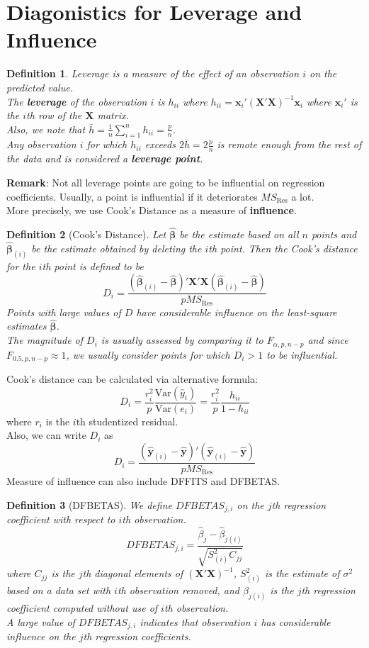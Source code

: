 \documentclass[11pt]{article}
\newcommand{\var}{\mathrm{Var}}
\newtheorem{definition}{Definition}[section]
\theoremstyle{definition}
\begin{document}
\section{Diagonistics for Leverage and Influence}
\begin{definition}
\normalfont Leverage is a measure of the effect of an observation $i$ on the predicted value.\\
The \textbf{leverage} of the observation $i$ is $h_{ii}$ where $h_{ii}=\bm{x}_i'(\bm{X}'\bm{X})^{-1}\bm{x}_i$ where $\bm{x}_i'$ is the $i$th row of the $\bm{X}$ matrix.\\
Also, we note that $\bar{h}=\frac{1}{n}\sum_{i=1}^n h_{ii}=\frac{p}{n}$.\\
Any observation $i$ for which $h_{ii}$ exceeds $2\bar{h}=2\frac{p}{n}$ is remote enough from the rest of the data and is considered a \textbf{leverage point}.
\end{definition}
\textbf{Remark}: Not all leverage points are going to be influential on regression coefficients. Usually, a point is influential if it deteriorates $MS_\text{Res}$ a lot.\\
More precisely, we use Cook's Distance as a measure of \textbf{influence}.
\begin{definition}[Cook's Distance]
\normalfont Let $\hat{\bm{\beta}}$ be the estimate based on all $n$ points and $\hat{\bm{\beta}}_{(i)}$ be the estimate obtained by deleting the $i$th point. Then the Cook's distance for the $i$th point is defined to be
\[
D_i=\frac{(\hat{\bm{\beta}}_{(i)}-\hat{\bm{\beta}})'\bm{X}'\bm{X}(\hat{\bm{\beta}}_{(i)}-\hat{\bm{\beta}})}{pMS_\text{Res}}
\]
Points with large values of $D$ have considerable influence on the least-square estimates $\hat{\bm{\beta}}$.\\
The magnitude of $D_i$ is usually assessed by comparing it to $F_{\alpha, p, n-p}$ and since $F_{0.5, p, n-p}\approx 1$, we usually consider points for which $D_i>1$ to be influential.
\end{definition}
Cook's distance can be calculated via alternative formula: 
\[
D_i=\frac{r_i^2}{p}\frac{\var(\hat{y}_i)}{\var(e_i)}=\frac{r_i^2}{p}\frac{h_{ii}}{1-h_{ii}}
\]
where $r_i$ is the $i$th studentized residual.\\
Also, we can write $D_i$ as
\[
D_i=\frac{(\hat{\bm{y}}_{(i)}-\hat{\bm{y}})'(\hat{\bm{y}}_{(i)}-\hat{\bm{y}})}{pMS_\text{Res}}
\]
Measure of influence can also include DFFITS and DFBETAS.
\begin{definition}[DFBETAS]
\normalfont We define $DFBETAS_{j,i}$ on the $j$th regression coefficient with respect to $i$th observation.
\[
DFBETAS_{j,i}=\frac{\hat{\beta}_j-\hat{\beta}_{j(i)}}{\sqrt{S_{(i)}^2C_{jj}}}
\]
where $C_{jj}$ is the $j$th diagonal elements of $(\bm{X}'\bm{X})^{-1}$, $S_{(i)}^2$ is the estimate of $\sigma^2$ based on a data set with $i$th observation removed, and $\hat{\beta}_{j(i)}$ is the $j$th regression coefficient computed without use of $i$th observation.\\
A large value of $DFBETAS_{j,i}$ indicates that observation $i$ has considerable influence on the $j$th regression coefficients.\\
\end{definition}
\end{document}
